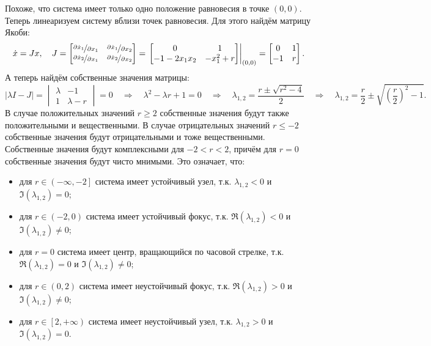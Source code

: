 \documentclass[a4paper]{article}
\begin{document}
Похоже, что система имеет только одно положение равновесия в точке $(0, 0)$.\\[0.5em]
Теперь линеаризуем систему вблизи точек равновесия. Для этого найдём матрицу Якоби:
$$\dot{x} = Jx,\quad J = \begin{bmatrix}
    \nicefrac{\partial \dot{x}_1}{\partial x_1} & \nicefrac{\partial \dot{x}_1}{\partial x_2} \\
    \nicefrac{\partial \dot{x}_2}{\partial x_1} & \nicefrac{\partial \dot{x}_2}{\partial x_2}
\end{bmatrix} = \left.\begin{bmatrix}
    0 & 1 \\
    -1 - 2x_1x_2 & -x_1^2 + r
\end{bmatrix}\right|_{(0, 0)} = \begin{bmatrix}
    0 & 1 \\
    -1 & r
\end{bmatrix}.$$
А теперь найдём собственные значения матрицы:
$$|\lambda I - J| = \begin{vmatrix}
    \lambda & -1 \\
    1 & \lambda - r
\end{vmatrix} = 0 \quad\Rightarrow\quad \lambda^2-\lambda r + 1 = 0 \quad\Rightarrow\quad \lambda_{1,2} = \frac{r \pm \sqrt{r^2-4}}{2} \quad\Rightarrow\quad \lambda_{1,2} = \frac{r}{2} \pm \sqrt{\left( \frac{r}{2} \right)^2-1}.$$
В случае положительных значений $r\geqslant2$ собственные значения будут также положительными и вещественными. В случае отрицательных значений $r \leqslant -2$ собственные значения будут отрицательными и тоже вещественными. Собственные значения будут комплексными для $-2 < r < 2$, причём для $r = 0$ собственные значения будут чисто мнимыми. Это означает, что:
\begin{itemize}
    \item для $r \in \left( -\infty, -2\right]$ система имеет устойчивый узел, т.к. $\lambda_{1,2} < 0$ и $\Im(\lambda_{1,2}) = 0$;
    \item для $r \in \left( -2, 0\right)$ система имеет устойчивый фокус, т.к. $\Re(\lambda_{1,2}) < 0$ и $\Im(\lambda_{1,2}) \neq 0$;
    \item для $r = 0$ система имеет центр, вращающийся по часовой стрелке, т.к. $\Re(\lambda_{1,2}) = 0$ и $\Im(\lambda_{1,2}) \neq 0$;
    \item для $r \in \left( 0, 2\right)$ система имеет неустойчивый фокус, т.к. $\Re(\lambda_{1,2}) > 0$ и $\Im(\lambda_{1,2}) \neq 0$;
    \item для $r \in \left[ 2, +\infty\right)$ система имеет неустойчивый узел, т.к. $\lambda_{1,2} > 0$ и $\Im(\lambda_{1,2}) = 0$.
\end{itemize}
\end{document}
